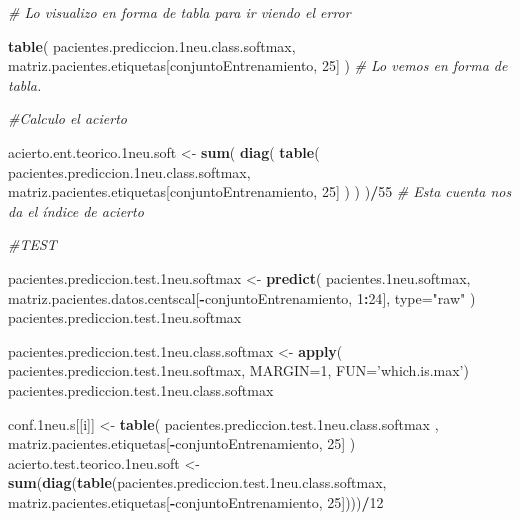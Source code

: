\documentclass[]{article}
\newenvironment{Shaded}{\begin{snugshade}}{\end{snugshade}}
\newcommand{\CommentTok}[1]{\textcolor[rgb]{0.56,0.35,0.01}{\textit{#1}}}
\newcommand{\DataTypeTok}[1]{\textcolor[rgb]{0.13,0.29,0.53}{#1}}
\newcommand{\DecValTok}[1]{\textcolor[rgb]{0.00,0.00,0.81}{#1}}
\newcommand{\FloatTok}[1]{\textcolor[rgb]{0.00,0.00,0.81}{#1}}
\newcommand{\KeywordTok}[1]{\textcolor[rgb]{0.13,0.29,0.53}{\textbf{#1}}}
\newcommand{\NormalTok}[1]{#1}
\newcommand{\OperatorTok}[1]{\textcolor[rgb]{0.81,0.36,0.00}{\textbf{#1}}}
\newcommand{\StringTok}[1]{\textcolor[rgb]{0.31,0.60,0.02}{#1}}
\begin{document}
\begin{Shaded}
\begin{Highlighting}[]
  \CommentTok{# Lo visualizo en forma de tabla para ir viendo el error}
  
  \KeywordTok{table}\NormalTok{( pacientes.prediccion}\FloatTok{.1}\NormalTok{neu.class.softmax, matriz.pacientes.etiquetas[conjuntoEntrenamiento, }\DecValTok{25}\NormalTok{] )  }\CommentTok{# Lo vemos en forma de tabla.}
  
  \CommentTok{#Calculo el acierto}
  
\NormalTok{  acierto.ent.teorico}\FloatTok{.1}\NormalTok{neu.soft <-}\StringTok{ }\KeywordTok{sum}\NormalTok{( }\KeywordTok{diag}\NormalTok{( }\KeywordTok{table}\NormalTok{( pacientes.prediccion}\FloatTok{.1}\NormalTok{neu.class.softmax, matriz.pacientes.etiquetas[conjuntoEntrenamiento, }\DecValTok{25}\NormalTok{] ) ) )}\OperatorTok{/}\DecValTok{55} \CommentTok{# Esta cuenta nos da el índice de acierto}
  
  \CommentTok{#TEST}
  
\NormalTok{  pacientes.prediccion.test}\FloatTok{.1}\NormalTok{neu.softmax <-}\StringTok{ }\KeywordTok{predict}\NormalTok{( pacientes}\FloatTok{.1}\NormalTok{neu.softmax,}
\NormalTok{                                                     matriz.pacientes.datos.centscal[}\OperatorTok{-}\NormalTok{conjuntoEntrenamiento, }\DecValTok{1}\OperatorTok{:}\DecValTok{24}\NormalTok{], }
                                                     \DataTypeTok{type=}\StringTok{"raw"}\NormalTok{ )}
\NormalTok{  pacientes.prediccion.test}\FloatTok{.1}\NormalTok{neu.softmax}
  
\NormalTok{  pacientes.prediccion.test}\FloatTok{.1}\NormalTok{neu.class.softmax <-}\StringTok{ }\KeywordTok{apply}\NormalTok{( pacientes.prediccion.test}\FloatTok{.1}\NormalTok{neu.softmax, }\DataTypeTok{MARGIN=}\DecValTok{1}\NormalTok{, }\DataTypeTok{FUN=}\StringTok{'which.is.max'}\NormalTok{)}
\NormalTok{  pacientes.prediccion.test}\FloatTok{.1}\NormalTok{neu.class.softmax}
  
\NormalTok{  conf}\FloatTok{.1}\NormalTok{neu.s[[i]] <-}\StringTok{ }\KeywordTok{table}\NormalTok{( pacientes.prediccion.test}\FloatTok{.1}\NormalTok{neu.class.softmax , matriz.pacientes.etiquetas[}\OperatorTok{-}\NormalTok{conjuntoEntrenamiento, }\DecValTok{25}\NormalTok{] )}
\NormalTok{  acierto.test.teorico}\FloatTok{.1}\NormalTok{neu.soft <-}\StringTok{ }\KeywordTok{sum}\NormalTok{(}\KeywordTok{diag}\NormalTok{(}\KeywordTok{table}\NormalTok{(pacientes.prediccion.test}\FloatTok{.1}\NormalTok{neu.class.softmax, matriz.pacientes.etiquetas[}\OperatorTok{-}\NormalTok{conjuntoEntrenamiento, }\DecValTok{25}\NormalTok{])))}\OperatorTok{/}\DecValTok{12}
  

\end{Highlighting}
\end{Shaded}
\end{document}
